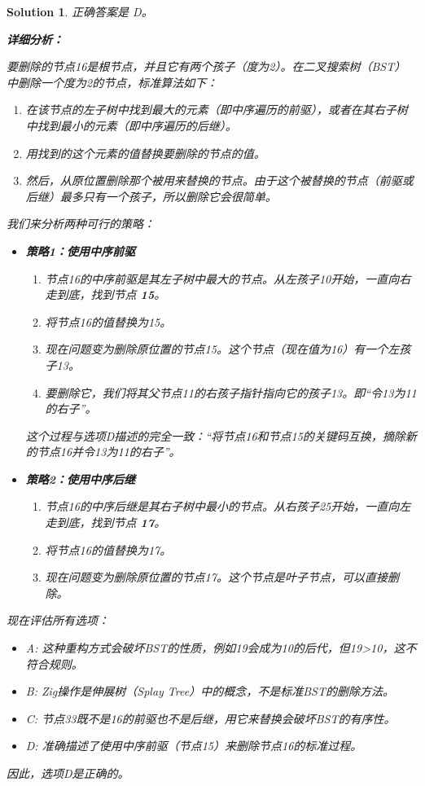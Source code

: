 \documentclass[UTF8]{report}
\newtheorem{solution}{Solution}
\theoremstyle{MyLineTheoremStyle} %
\theoremstyle{MyBlockTheoremStyle} %
\theoremstyle{MySubsubsectionStyle} %
\begin{document}
\begin{solution}
正确答案是 D。

\textbf{详细分析：}

要删除的节点16是根节点，并且它有两个孩子（度为2）。在二叉搜索树（BST）中删除一个度为2的节点，标准算法如下：
\begin{enumerate}
    \item 在该节点的左子树中找到最大的元素（即中序遍历的前驱），或者在其右子树中找到最小的元素（即中序遍历的后继）。
    \item 用找到的这个元素的值替换要删除的节点的值。
    \item 然后，从原位置删除那个被用来替换的节点。由于这个被替换的节点（前驱或后继）最多只有一个孩子，所以删除它会很简单。
\end{enumerate}

我们来分析两种可行的策略：
\begin{itemize}
    \item \textbf{策略1：使用中序前驱}
        \begin{enumerate}
            \item 节点16的中序前驱是其左子树中最大的节点。从左孩子10开始，一直向右走到底，找到节点 \textbf{15}。
            \item 将节点16的值替换为15。
            \item 现在问题变为删除原位置的节点15。这个节点（现在值为16）有一个左孩子13。
            \item 要删除它，我们将其父节点11的右孩子指针指向它的孩子13。即“令13为11的右子”。
        \end{enumerate}
        这个过程与选项D描述的完全一致：“将节点16和节点15的关键码互换，摘除新的节点16并令13为11的右子”。

    \item \textbf{策略2：使用中序后继}
        \begin{enumerate}
            \item 节点16的中序后继是其右子树中最小的节点。从右孩子25开始，一直向左走到底，找到节点 \textbf{17}。
            \item 将节点16的值替换为17。
            \item 现在问题变为删除原位置的节点17。这个节点是叶子节点，可以直接删除。
        \end{enumerate}
\end{itemize}

现在评估所有选项：
\begin{itemize}
    \item A: 这种重构方式会破坏BST的性质，例如19会成为10的后代，但19>10，这不符合规则。
    \item B: Zig操作是伸展树（Splay Tree）中的概念，不是标准BST的删除方法。
    \item C: 节点33既不是16的前驱也不是后继，用它来替换会破坏BST的有序性。
    \item D: 准确描述了使用中序前驱（节点15）来删除节点16的标准过程。
\end{itemize}

因此，选项D是正确的。
\end{solution}
\end{document}
